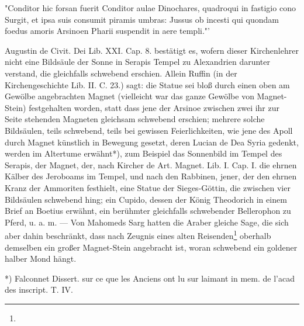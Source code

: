 \documentclass[a4paper, 11pt, oneside, polutonikogreek, german]{article}
\begin{document}
"Conditor hic forsan fuerit Conditor aulae Dinochares, quadroqui in fastigio cono Surgit, et ipsa suis consumit piramis umbras: Jussus ob incesti qui quondam foedus amoris Arsinoen Pharii suspendit in aere templi."'

Augustin de Civit. Dei Lib. XXI. Cap. 8. bestätigt es, wofern dieser Kirchenlehrer nicht eine Bildsäule der Sonne in Serapis Tempel zu Alexandrien darunter verstand, die gleichfalls schwebend erschien. Allein Ruffin (in der Kirchengeschichte Lib. II. C. 23.) sagt: die Statue sei bloß durch einen oben am Gewölbe angebrachten Magnet (vielleicht war das ganze Gewölbe von Magnet-Stein) festgehalten worden, statt dass jene der Arsinoe zwischen zwei ihr zur Seite stehenden Magneten gleichsam schwebend erschien; mehrere solche Bildsäulen, teils schwebend, teils bei gewissen Feierlichkeiten, wie jene des Apoll durch Magnet künstlich in Bewegung gesetzt, deren Lucian de Dea Syria gedenkt, werden im Altertume erwähnt*), zum Beispiel das Sonnenbild im Tempel des Serapis, der Magnet, der, nach Kircher de Art. Magnet. Lib. I. Cap. I. die ehrnen Kälber des Jeroboams im Tempel, und nach den Rabbinen, jener, der den ehrnen Kranz der Ammoriten festhielt, eine Statue der Sieges-Göttin, die zwischen vier Bildsäulen schwebend hing; ein Cupido, dessen der König Theodorich in einem Brief an Boetius erwähnt, ein berühmter gleichfalls schwebender Bellerophon zu Pferd, u. a. m. --- Von Mahomeds Sarg hatten die Araber gleiche Sage, die sich aber dahin beschränkt, dass nach Zeugnis eines alten Reisenden\footnote{} oberhalb demselben ein großer Magnet-Stein angebracht ist, woran schwebend ein goldener halber Mond hängt.

*) Falconnet Dissert. sur ce que les Anciens ont lu sur laimant in mem. de l'acad des inscript. T. IV.
\end{document}
